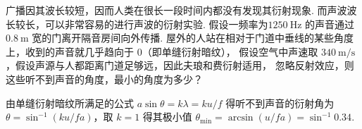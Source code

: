 \begin{problem}[本题8分]
  广播因其波长较短，因而人类在很长一段时间内都没有发现其衍射现象.
  而声波波长较长，可以非常容易的进行声波的衍射实验. 假设一频率为$\qty{1250}\Hz$
  的声音通过 $\qty{0.8}\m$ 宽的门离开隔音房间向外传播.
  屋外的人站在相对于门道中垂线的某些角度上，收到的声音就几乎趋向于 $0$（即单缝衍射暗纹），
  假设空气中声速取 $\qty{340}{\m/\s}$，假设声源与人都距离门道足够远，因此夫琅和费衍射适用，
  忽略反射效应，则这些听不到声音的角度，最小的角度为多少？
\end{problem}
\scratch[6ex]
\begin{solution}
  由单缝衍射暗纹所满足的公式 $a\sin\theta = k\lambda = ku/f$ 得听不到声音的衍射角为 
  $\theta = \sin^{-1}(ku/fa)$，取 $k = 1$ 得其极小值
  $\theta_{\min} = \arcsin(u/fa) = \sin^{-1} 0.34$.
\end{solution}